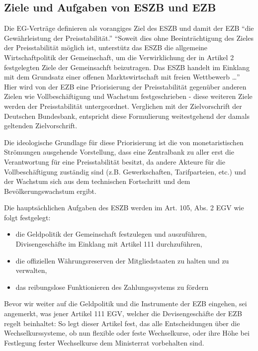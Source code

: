 \documentclass[
    onecolumn,
    a4paper,
    abstracton,
    parskip=half
    ,final
    ]{scrartcl}
\begin{document}
\subsection{Ziele und Aufgaben von ESZB und EZB}
Die EG-Vertr{\"a}ge definieren als vorangiges Ziel des ESZB und damit der EZB "`die Gew{\"a}hrleistung der Preisstabilit{\"a}t."'
"`Soweit dies ohne Beeintr{\"a}chtigung des Zieles der Preisstabilit{\"a}t m{\"o}glich ist, unterst{\"u}tz das ESZB die allgemeine Wirtschaftpolitik der Gemeinschaft, um die Verwirklichung der in Artikel 2 festgelegten Ziele der Gemeinsachft beizutragen. Das ESZB handelt im Einklang mit dem Grundsatz einer offenen Marktswirtschaft mit freien Wettbewerb \ldots"'\citep[vgl.][S.554]{Basseler2010}
Hier wird von der EZB eine Priorisierung der Preisstabilit{\"a}t gegen{\"u}ber anderen Zielen wie Vollbesch{\"a}ftigung und Wachstum festgeschrieben - diese weiteren Ziele werden der Preisstabilit{\"a}t untergeordnet. Verglichen mit der Zielvorschrift der Deutschen Bundesbank, entspricht diese Formulierung weitestgehend der damals geltenden Zielvorschrift.\citep[vgl.][S.554]{Basseler2010}

Die ideologische Grundlage f{\"u}r diese Priorisierung ist die von monetaristischen Str{\"o}mungen ausgehende Vorstellung, dass eine Zentralbank zu aller erst die Verantwortung f{\"u}r eine Preisstabilit{\"a}t besitzt, da andere Akteure f{\"u}r die Vollbesch{\"a}ftigung zust{\"a}ndig sind (z.B. Gewerkschaften, Tarifparteien, etc.) und der Wachstum sich aus dem technischen Fortschritt und dem Bev{\"o}lkerungswachstum ergibt.

Die haupts{\"a}chlichen Aufgaben des ESZB werden im Art. 105, Abs. 2 EGV wie folgt festgelegt:
\begin{itemize}
    \item{die Geldpolitik der Gemeinschaft festzulegen und auszuf{\"u}hren, Divisengesch{\"a}fte im Einklang mit Artikel 111 durchzuf{\"u}hren,}
    \item{die offiziellen W{\"a}hrungsreserven der Mitgliedstaaten zu halten und zu verwalten,}
    \item{das reibungslose Funktionieren des Zahlungssystems zu f{\"o}rdern}
\end{itemize}

Bevor wir weiter auf die Geldpolitik und die Instrumente der EZB eingehen, sei angemerkt, was jener Artikel 111 EGV, welcher die Devisengesch{\"a}fte der EZB regelt beinhaltet:
So legt dieser Artikel fest, das alle Entscheidungen {\"u}ber die Wechselkurssysteme, ob nun flexible oder feste Wechselkurse, oder ihre H{\"o}he bei Festlegung fester Wechselkurse dem Ministerrat vorbehalten sind.  \citep[vgl.][S.555]{Basseler2010}
\end{document}
